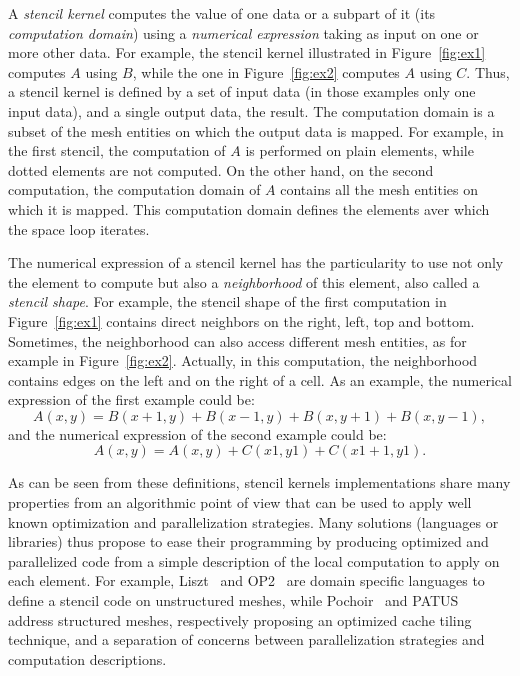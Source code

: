 
A \emph{stencil kernel} computes the value of one data or a subpart of it (its \emph{computation domain}) using a \emph{numerical expression} taking as input on one or more other data.
For example, the stencil kernel illustrated in Figure~\ref{fig:ex1} computes $A$ using $B$, while the one in Figure~\ref{fig:ex2} computes $A$ using $C$. Thus, a stencil kernel is defined by a set of input data (in those examples only one input data), and a single output data, the result. 
The computation domain is a subset of the mesh entities on which the output data is mapped. For example, in the first stencil, the computation of $A$ is performed on plain elements, while dotted elements are not computed. On the other hand, on the second computation, the computation domain of $A$ contains all the mesh entities on which it is mapped. This computation domain defines the elements aver which the space loop iterates.

The numerical expression of a stencil kernel has the particularity to use not only the element to compute but also a \emph{neighborhood} of this element, also called a \emph{stencil shape}. For example, the stencil shape of the first computation in Figure~\ref{fig:ex1} contains direct neighbors on the right, left, top and bottom. Sometimes, the neighborhood can also access different mesh entities, as for example in Figure~\ref{fig:ex2}. Actually, in this computation, the neighborhood contains edges on the left and on the right of a cell. As an example, the numerical expression of the first example could be:
\begin{equation*} 
A(x,y) = B(x+1,y)+B(x-1,y)+B(x,y+1)+B(x,y-1),
\end{equation*}
and the numerical expression of the second example could be:
\begin{equation*} 
A(x,y) = A(x,y)+C(x1,y1)+C(x1+1,y1).
\end{equation*}

As can be seen from these definitions, stencil kernels implementations share many properties from an algorithmic point of view that can be used to apply well known optimization and parallelization strategies.
Many solutions (languages or libraries) thus propose to ease their programming by producing optimized and parallelized code from a simple description of the local computation to apply on each element.
For example, Liszt~\cite{DeVito2011LDS} and OP2~\cite{Giles2011} are domain specific languages to define a stencil code on unstructured meshes, while Pochoir~\cite{spaaTangCKLL11} and PATUS~\cite{citeulike12258902} address structured meshes, respectively proposing an optimized cache tiling technique, and a separation of concerns between parallelization strategies and computation descriptions.

